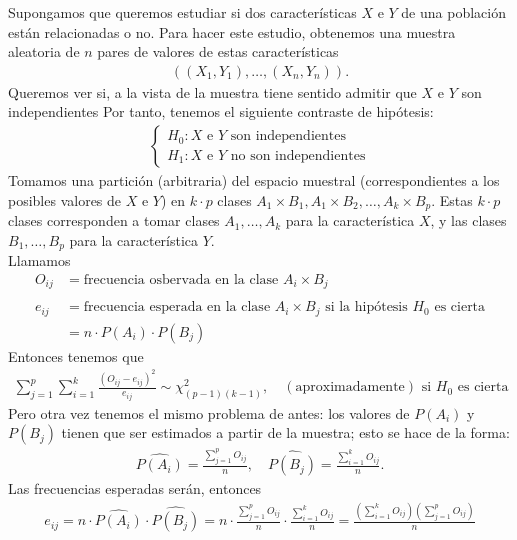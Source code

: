 \noindent Supongamos que queremos estudiar si dos características $X$ e $Y$ de una población están relacionadas o no. Para hacer este estudio, obtenemos una muestra aleatoria de $n$ pares de valores de estas características
\begin{align*}
    ((X_1,Y_1), \ldots, (X_n,Y_n)).
\end{align*}
Queremos ver si, a la vista de la muestra tiene sentido admitir que $X$ e $Y$ son independientes Por tanto, tenemos el siguiente contraste de hipótesis:
\begin{align*}
    \begin{cases}
        H_0 : \text{$X$ e $Y$ son independientes} \\
        H_1 : \text{$X$ e $Y$ no son independientes}
    \end{cases}
\end{align*}
Tomamos una partición (arbitraria) del espacio muestral (correspondientes a los posibles valores de $X$ e $Y$) en $k \cdot p$ clases $A_1 \times B_1, A_1 \times B_2, \ldots, A_k \times B_p$. Estas $k \cdot p$ clases corresponden a tomar clases $A_1, \ldots, A_k$ para la característica $X$, y las clases $B_1, \ldots, B_p$ para la característica $Y$.
\\
\newline
Llamamos
\begin{align*}
    O_{ij} &= \text{frecuencia osbervada en la clase $A_i \times B_j$} \\ \\
    e_{ij} &= \text{frecuencia esperada en la clase $A_i \times B_j$ si la hipótesis $H_0$ es cierta} \\
    &= n \cdot P(A_i) \cdot P(B_j)
\end{align*}
Entonces tenemos que
\begin{align*}
    \sum_{j=1}^{p}\sum_{i=1}^{k} \frac{(O_{ij} - e_{ij})^2}{e_{ij}} \sim \chi^2_{(p-1)(k-1)}, \quad (\text{aproximadamente}) \text{ si $H_0$ es cierta}
\end{align*}
Pero otra vez tenemos el mismo problema de antes: los valores de $P(A_i)$ y $P(B_j)$ tienen que ser estimados a partir de la muestra; esto se hace de la forma:
\begin{align*}
    \widehat{P(A_i)} = \frac{\sum_{j=1}^{p} O_{ij}}{n}, \quad \widehat{P(B_j)} = \frac{\sum_{i=1}^{k} O_{ij}}{n}.
\end{align*}
Las frecuencias esperadas serán, entonces
\begin{align*}
    e_{ij} = n \cdot \widehat{P(A_i)} \cdot \widehat{P(B_j)} = n \cdot \frac{\sum_{j=1}^{p} O_{ij}}{n} \cdot  \frac{\sum_{i=1}^{k} O_{ij}}{n} = \frac{\left(\sum_{i=1}^{k} O_{ij}\right)\left(\sum_{j=1}^{p} O_{ij}\right)}{n}
\end{align*}
